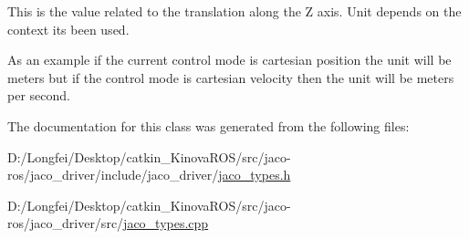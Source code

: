 This is the value related to the translation along the Z axis. Unit depends on the context it\textquotesingle{}s been used. 

As an example if the current control mode is cartesian position the unit will be meters but if the control mode is cartesian velocity then the unit will be meters per second. 

The documentation for this class was generated from the following files\+:\begin{DoxyCompactItemize}
\item 
D\+:/\+Longfei/\+Desktop/catkin\+\_\+\+Kinova\+R\+O\+S/src/jaco-\/ros/jaco\+\_\+driver/include/jaco\+\_\+driver/\hyperlink{jaco__types_8h}{jaco\+\_\+types.\+h}\item 
D\+:/\+Longfei/\+Desktop/catkin\+\_\+\+Kinova\+R\+O\+S/src/jaco-\/ros/jaco\+\_\+driver/src/\hyperlink{jaco__types_8cpp}{jaco\+\_\+types.\+cpp}\end{DoxyCompactItemize}
